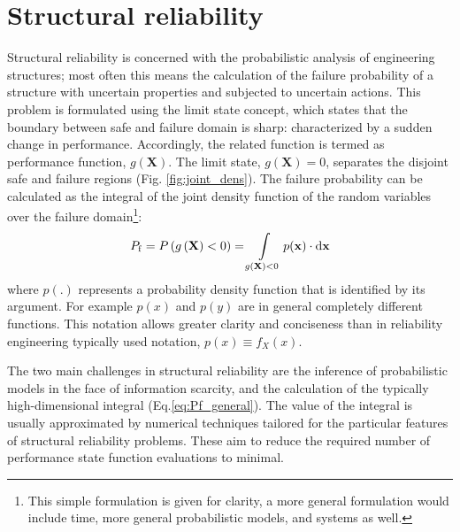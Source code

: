 
\section{Structural reliability}
Structural reliability is concerned with the probabilistic analysis of engineering structures; most often this means the calculation of the failure probability of a structure with uncertain properties and subjected to uncertain actions. This problem is formulated using the limit state concept, which states that the boundary between safe and failure domain is sharp: characterized by a sudden change in performance. Accordingly, the related function is termed as performance function, $g(\mathbf{X})$. The limit state, $g(\mathbf{X})=0$, separates the disjoint safe and failure regions (Fig. \ref{fig:joint_dens}). The failure probability can be calculated as the integral of the joint density function of the random variables over the failure domain\footnote{This simple formulation is given for clarity, a more general formulation would include time, more general probabilistic models, and systems as well.}:
\begin{equation}
	\label{eq:Pf_general}
	 {P_{\mathrm{f}}} = P\left( {g\left( {\bf{X}} \right) < 0} \right) = \int\limits_{g\left( {\bf{X}} \right) < 0} {p({\bf{x}}) \cdot \mathrm{d}{\bf{x}}}
\end{equation}
where $p(.)$ represents a probability density function that is identified by its argument. For example $p(x)$ and $p(y)$ are in general completely different functions. This notation allows greater clarity and conciseness than in reliability engineering typically used notation, $p(x) \equiv f_X(x)$.

The two main challenges in structural reliability are the inference of probabilistic models in the face of information scarcity, and the calculation of the typically high-dimensional integral (Eq.\ref{eq:Pf_general}). The value of the integral is usually approximated by numerical techniques tailored for the particular features of structural reliability problems. These aim to reduce the required number of performance state function evaluations to minimal.

